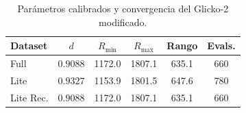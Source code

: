 \begin{table}[htbp]
    \centering
    \caption{Par\'ametros calibrados y convergencia del Glicko-2 modificado.}
    \label{tab:glicko_convergencia}
    \begin{tabular}{lccccc}
        \toprule
        \textbf{Dataset} & $d$ & $R_{\min}$ & $R_{\max}$ & \textbf{Rango} & \textbf{Evals.} \\
        \midrule
        Full & $0.9088$ & 1172.0 & 1807.1 & 635.1 & 660 \\
        Lite & $0.9327$ & 1153.9 & 1801.5 & 647.6 & 780 \\
        Lite Rec. & $0.9088$ & 1172.0 & 1807.1 & 635.1 & 660 \\
        \bottomrule
    \end{tabular}
\end{table}